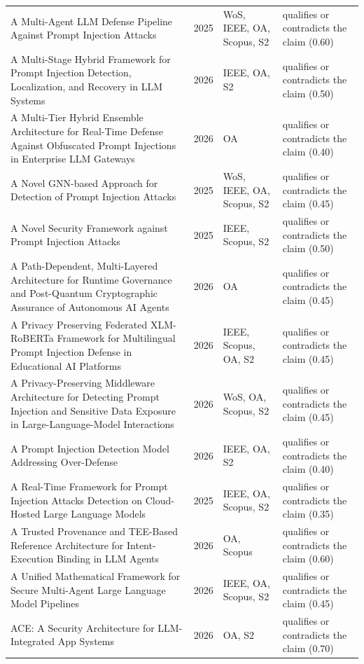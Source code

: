 \begin{longtable}{@{}%
  >{\raggedright\arraybackslash}p{}c%
  >{\raggedright\arraybackslash}p{}%
  >{\raggedright\arraybackslash}p{}@{}}
A Multi-Agent LLM Defense Pipeline Against Prompt Injection Attacks & 2025 & WoS, IEEE, OA, Scopus, S2 & qualifies or contradicts the claim (0.60) \\
A Multi-Stage Hybrid Framework for Prompt Injection Detection, Localization, and Recovery in LLM Systems & 2026 & IEEE, OA, S2 & qualifies or contradicts the claim (0.50) \\
A Multi-Tier Hybrid Ensemble Architecture for Real-Time Defense Against Obfuscated Prompt Injections in Enterprise LLM Gateways & 2026 & OA & qualifies or contradicts the claim (0.40) \\
A Novel GNN-based Approach for Detection of Prompt Injection Attacks & 2025 & WoS, IEEE, OA, Scopus, S2 & qualifies or contradicts the claim (0.45) \\
A Novel Security Framework against Prompt Injection Attacks & 2025 & IEEE, Scopus, S2 & qualifies or contradicts the claim (0.50) \\
A Path-Dependent, Multi-Layered Architecture for Runtime Governance and Post-Quantum Cryptographic Assurance of Autonomous AI Agents & 2026 & OA & qualifies or contradicts the claim (0.45) \\
A Privacy Preserving Federated XLM-RoBERTa Framework for Multilingual Prompt Injection Defense in Educational AI Platforms & 2026 & IEEE, Scopus, OA, S2 & qualifies or contradicts the claim (0.45) \\
A Privacy-Preserving Middleware Architecture for Detecting Prompt Injection and Sensitive Data Exposure in Large-Language-Model Interactions & 2026 & WoS, OA, Scopus, S2 & qualifies or contradicts the claim (0.45) \\
A Prompt Injection Detection Model Addressing Over-Defense & 2026 & IEEE, OA, S2 & qualifies or contradicts the claim (0.40) \\
A Real-Time Framework for Prompt Injection Attacks Detection on Cloud-Hosted Large Language Models & 2025 & IEEE, OA, Scopus, S2 & qualifies or contradicts the claim (0.35) \\
A Trusted Provenance and TEE-Based Reference Architecture for Intent-Execution Binding in LLM Agents & 2026 & OA, Scopus & qualifies or contradicts the claim (0.60) \\
A Unified Mathematical Framework for Secure Multi-Agent Large Language Model Pipelines & 2026 & IEEE, OA, Scopus, S2 & qualifies or contradicts the claim (0.45) \\
ACE: A Security Architecture for LLM-Integrated App Systems & 2026 & OA, S2 & qualifies or contradicts the claim (0.70) \\

\end{longtable}
